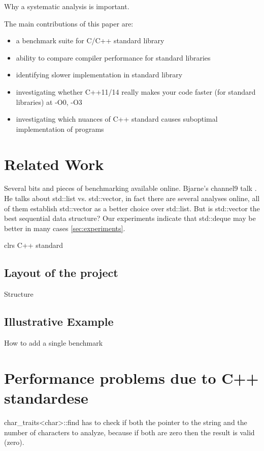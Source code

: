 \documentclass{sig-alternate}
\begin{document}
Why a systematic analysis is important.

The main contributions of this paper are:
\begin{itemize}
\item a benchmark suite for C/C++ standard library
\item ability to compare compiler performance for standard libraries
\item identifying slower implementation in standard library
\item investigating whether C++11/14 really makes your code faster (for
standard libraries) at -O0, -O3
\item investigating which nuances of C++ standard causes suboptimal
implementation of programs
\end{itemize}

\section{Related Work}
Several bits and pieces of benchmarking available online.  Bjarne's channel9
talk \cite{stroustrup2012}.  He talks about std::list vs. std::vector, in fact
there are several analyses online, all of them establish std::vector as a better
choice over std::list. But is std::vector the best sequential data structure?
Our experiments indicate that std::deque may be better in many cases
\ref{sec:experiments}.

clrs \cite{clrs}
C++ standard \cite{c++fcd}

\newpage

\subsection{Layout of the project}
Structure

\subsection{Illustrative Example} \label{subsec:example}
How to add a single benchmark \cite{googlebench}
\newpage


\section{Performance problems due to C++ standardese}
char\_traits<char>::find has to check if both the pointer to the string and the
number of characters to analyze, because if both are zero then the result is
valid (zero).
\end{document}
